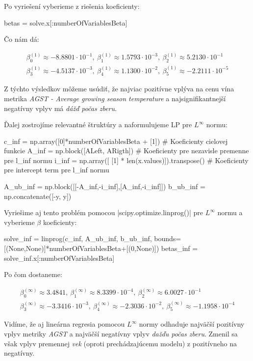 \documentclass[report.tex]{subfiles}
\begin{document}
Po vyriešení vyberieme z riešenia koeficienty:

\begin{python}
betas = solve.x[:numberOfVariablesBeta]
\end{python}

Čo nám dá: 

\begin{gather*}
	\beta_0^{(1)} \approx -8.8801 \cdot 10^{-1} ,~\beta_1^{(1)} \approx 1.5793\cdot 10^{-3},~\beta_2^{(1)} \approx 5.2130\cdot 10^{-1} \\
	\beta_3^{(1)} \approx -4.5137\cdot 10^{-3} ,~\beta_4^{(1)} \approx 1.1300\cdot 10^{-2}  ,~\beta_5^{(1)} \approx -2.2111\cdot 10^{-5}
\end{gather*}

Z týchto výsledkov môžeme usúdiť, že najviac pozitívne vplýva na cenu vína metrika \textit{AGST - Average growing season temperature} a najsignifikantnejší negatívny vplyv má \textit{dážď počas zberu}.


\newpage

Ďalej zostrojíme relevantné štruktúry a naformulujeme LP pre $L^{\infty}$ normu:

\begin{python}
c_inf = np.array([0]*numberOfVariablesBeta + [1]) # Koeficienty cielovej funkcie
A_inf = np.block([ALeft, ARigth]) # Koeficienty pre nezavisle premenne pre l_inf normu
i_inf = np.array([ [1] * len(x.values)]).transpose() # Koeficienty pre intercept term pre l_inf normu

A_ub_inf = np.block([[-A_inf,-i_inf],[A_inf,-i_inf]])
b_ub_inf = np.concatenate([-y, y]) 
\end{python}

Vyriešime aj tento problém pomocou \pyth|scipy.optimize.linprog()| pre $L^{\infty}$ normu a vyberieme $\beta$ koeficienty:

\begin{python}
solve_inf = linprog(c_inf, A_ub_inf, b_ub_inf, bounds=[(None,None)]*numberOfVariablesBeta+[(0,None)])
betas_inf = solve_inf.x[:numberOfVariablesBeta]
\end{python}

Po čom dostaneme:

\begin{gather*}
	\beta_0^{(\infty)} \approx  3.4841 ,~\beta_1^{(\infty)} \approx 8.3399\cdot 10^{-4} ,~\beta_2^{(\infty)} \approx 6.0027\cdot 10^{-1} \\
	\beta_3^{(\infty)} \approx -3.3416\cdot 10^{-3} ,~\beta_4^{(\infty)} \approx -2.3036\cdot 10^{-2}  ,~\beta_5^{(\infty)} \approx -1.1958\cdot 10^{-4}
\end{gather*}

Vidíme, že aj lineárna regresia pomocou $L^{\infty}$ normy odhaduje najväčší pozitívny vplyv metriky \textit{AGST} a najväčší negatívny vplyv \textit{dažďu počas zberu}. Zmenil sa však vplyv premennej \textit{vek} (oproti prechádzajúcemu modelu) z pozitívneho na negatívny.
\end{document}

